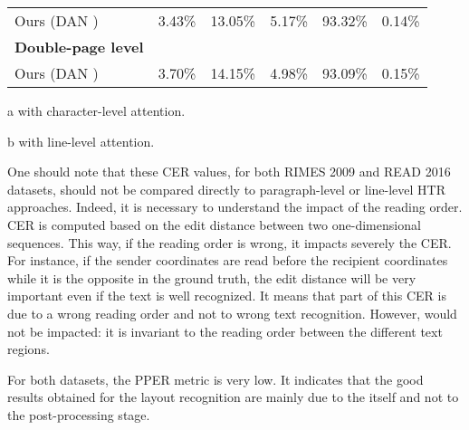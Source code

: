 \begin{table*}[ht]
{\begin{threeparttable}[b]
\begin{tabular}{ l c c c c c}
        Ours (DAN\tnote{a} ) & 3.43\% & 13.05\% & 5.17\% & 93.32\% & 0.14\%\\
        \textbf{Double-page level}\\
        Ours (DAN\tnote{a} ) & 3.70\% & 14.15\% & 4.98\% & 93.09\% & 0.15\%\\
        \hline
        \end{tabular}
        \begin{tablenotes}
            \item [a] with character-level attention.
            \item [b] with line-level attention.
        \end{tablenotes}
    \end{threeparttable}
    }
    \label{table:read}
\end{table*}


One should note that these CER values, for both RIMES 2009 and READ 2016 datasets, should not be compared directly to paragraph-level or line-level HTR approaches. Indeed, it is necessary to understand the impact of the reading order. CER is computed based on the edit distance between two one-dimensional sequences. This way, if the reading order is wrong, it impacts severely the CER. For instance, if the sender coordinates are read before the recipient coordinates while it is the opposite in the ground truth, the edit distance will be very important even if the text is well recognized. It means that part of this CER is due to a wrong reading order and not to wrong text recognition.
However,  would not be impacted: it is invariant to the reading order between the different text regions.

For both datasets, the PPER metric is very low. It indicates that the good results obtained for the layout recognition are mainly due to the \modelacc{} itself and not to the post-processing stage.

